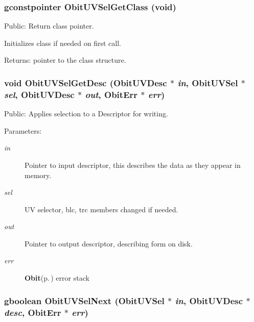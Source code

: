 \subsubsection{\setlength{\rightskip}{0pt plus 5cm}gconstpointer Obit\-UVSel\-Get\-Class (void)}\label{ObitUVSel_8h_a5}


Public: Return class pointer. 

Initializes class if needed on first call. \begin{Desc}
\item[Returns:]pointer to the class structure. \end{Desc}
\subsubsection{\setlength{\rightskip}{0pt plus 5cm}void Obit\-UVSel\-Get\-Desc ({\bf Obit\-UVDesc} $\ast$ {\em in}, {\bf Obit\-UVSel} $\ast$ {\em sel}, {\bf Obit\-UVDesc} $\ast$ {\em out}, {\bf Obit\-Err} $\ast$ {\em err})}\label{ObitUVSel_8h_a9}


Public: Applies selection to a Descriptor for writing. 

\begin{Desc}
\item[Parameters:]
\begin{description}
\item[{\em in}]Pointer to input descriptor, this describes the data as they appear in memory. \item[{\em sel}]UV selector, blc, trc members changed if needed. \item[{\em out}]Pointer to output descriptor, describing form on disk. \item[{\em err}]{\bf Obit}{\rm (p.\,\pageref{structObit})} error stack \end{description}
\end{Desc}
\subsubsection{\setlength{\rightskip}{0pt plus 5cm}gboolean Obit\-UVSel\-Next ({\bf Obit\-UVSel} $\ast$ {\em in}, {\bf Obit\-UVDesc} $\ast$ {\em desc}, {\bf Obit\-Err} $\ast$ {\em err})}\label{ObitUVSel_8h_a12}


